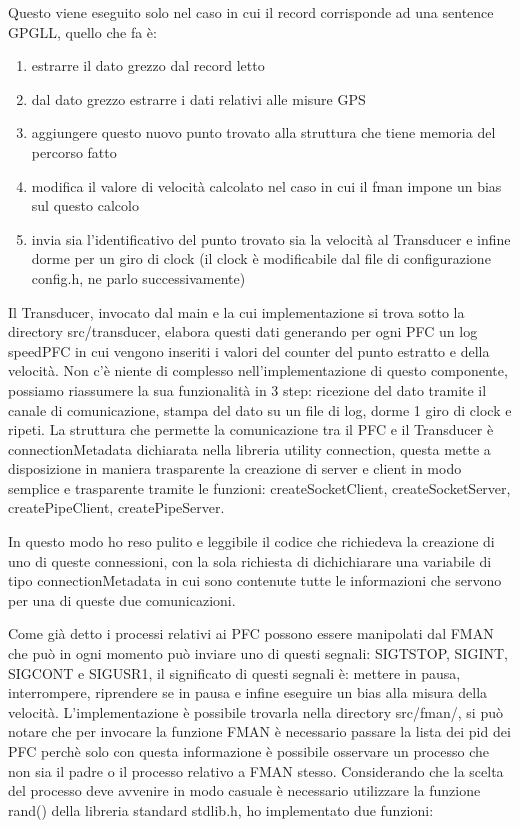 \documentclass{article}
\begin{document}
\begin{flushleft}
Questo viene eseguito solo nel caso in cui il record corrisponde ad una sentence GPGLL, quello che fa è:

\begin{enumerate}
    \item estrarre il dato grezzo dal record letto
    \item dal dato grezzo estrarre i dati relativi alle misure GPS
    \item aggiungere questo nuovo punto trovato alla struttura che tiene memoria del percorso fatto
    \item modifica il valore di velocità calcolato nel caso in cui il fman impone un bias sul questo calcolo
    \item invia sia l'identificativo del punto trovato sia la velocità al Transducer e infine dorme per un giro di clock (il clock è modificabile dal file di configurazione config.h, ne parlo successivamente)
\end{enumerate}

Il Transducer, invocato dal main e la cui implementazione si trova sotto la directory src/transducer, elabora questi dati generando per ogni PFC un log speedPFC in cui vengono inseriti i valori del counter del punto estratto e della velocità. Non c'è niente di complesso nell'implementazione di questo componente, possiamo riassumere la sua funzionalità in 3 step: ricezione del dato tramite il canale di comunicazione, stampa del dato su un file di log, dorme 1 giro di clock e ripeti. La struttura che permette la comunicazione tra il PFC e il Transducer è connectionMetadata dichiarata nella libreria utility connection, questa mette a disposizione in maniera trasparente la creazione di server e client in modo semplice e trasparente tramite le funzioni: createSocketClient, createSocketServer, createPipeClient, createPipeServer.

In questo modo ho reso pulito e leggibile il codice che richiedeva la creazione di uno di queste connessioni, con la sola richiesta di dichichiarare una variabile di tipo connectionMetadata in cui sono contenute tutte le informazioni che servono per una di queste due comunicazioni.

Come già detto i processi relativi ai PFC possono essere manipolati dal FMAN che può in ogni momento può inviare uno di questi segnali: SIGTSTOP, SIGINT, SIGCONT e SIGUSR1, il significato di questi segnali è: mettere in pausa, interrompere, riprendere se in pausa e infine eseguire un bias alla misura della velocità. L'implementazione è possibile trovarla nella directory src/fman/, si può notare che per invocare la funzione FMAN è necessario passare la lista dei pid dei PFC perchè solo con questa informazione è possibile osservare un processo che non sia il padre o il processo relativo a FMAN stesso. Considerando che la scelta del processo deve avvenire in modo casuale è necessario utilizzare la funzione rand() della libreria standard stdlib.h, ho implementato due funzioni:


\end{flushleft}
\end{document}
